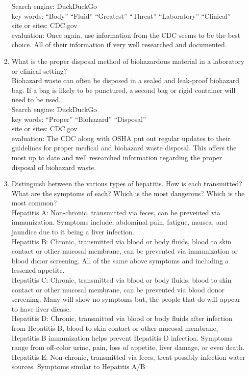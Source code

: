 \documentclass[letterpaper, 11pt]{article}
\begin{document}
\begin{enumerate}
Search engine: DuckDuckGo\\
key words: ``Body'' ``Fluid'' ``Greatest'' ``Threat'' ``Laboratory'' ``Clinical''\\
site or sites: CDC.gov\\
evaluation: Once again, use information from the CDC seems to be the best choice. All of their information if very well researched and documented.\\

\item What is the proper disposal method of biohazardous material in a laboratory or clinical setting?\\
Biohazard waste can often be disposed in a sealed and leak-proof biohazard bag. If a bag is likely to be punctured, a second bag or rigid container will need to be used.\\

Search engine: DuckDuckGo\\
key words: ``Proper'' ``Biohazard'' ``Disposal''\\
site or sites: CDC.gov\\
evaluation: The CDC along with OSHA put out regular updates to their guidelines for proper medical and biohazard waste disposal. This offers the most up to date and well researched information regarding the proper disposal of biohazard waste.\\

\item Distinguish between the various types of hepatitis. How is each transmitted? What are the symptoms of each? Which is the most dangerous? Which is the most common?\\
Hepatitis A: Non-chronic, transmitted via feces, can be prevented via immunization. Symptoms include, abdominal pain, fatigue, nausea, and jaundice due to it being a liver infection.\\
Hepatitis B: Chronic, transmitted via blood or body fluids, blood to skin contact or other mucosal membrane, can be prevented via immunization or blood donor screening. All of the same above symptoms and including a lessened appetite.\\
Hepatitis C: Chronic, transmitted via blood or body fluids, blood to skin contact or other mucosal membrane, can be prevented via blood donor screening. Many will show no symptoms but,  the people that do will appear to have liver diease.\\
Hepatitis D: Chronic, transmitted via blood or body fluids after infection from Hepatitis B, blood to skin contact or other mucosal membrane, Hepatitis B immunization helps prevent Hepatitis D infection. Symptoms range from off-color urine, pain, loss of appetite, liver damage, or even death.\\
Hepatitis E: Non-chronic, transmitted via feces, treat possibly infection water sources. Symptoms similar to Hepatitis A/B\\


\end{enumerate}
\end{document}

